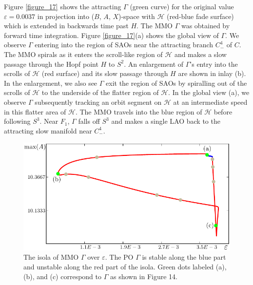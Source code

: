 \documentclass{ws-ijbc}
\begin{document}
Figure \ref{figure_17} shows the attracting $\Gamma$ (green curve) for the original value $\varepsilon=0.0037$ in projection into ($B$, $A$, $X$)-space with $\mathscr{H}$ (red-blue fade surface) which is extended in backwards time past $H$.  The MMO $\Gamma$ was obtained by forward time integration.  Figure \ref{figure_17}(a) shows the global view of $\Gamma$.  We observe $\Gamma$ entering into the region of SAOs near the attracting branch $C^4_-$ of $C$.  The MMO spirals as it enters the scroll-like region of $\mathscr{H}$ and makes a slow passage through the Hopf point $H$ to $S^2$.  An enlargement of $\Gamma$'s entry into the scrolls of $\mathscr{H}$ (red surface) and its slow passage through $H$ are shown in inlay (b).  In the enlargement, we also see $\Gamma$ exit the region of SAOs by spiralling out of the scrolls of $\mathscr{H}$ to the underside of the flatter region of $\mathscr{H}$.  In the global view (a), we observe $\Gamma$ subsequently tracking an orbit segment on $\mathscr{H}$ at an intermediate speed in this flatter area of $\mathscr{H}$.  The MMO travels into the blue region of $\mathscr{H}$ before following $S^3$.  Near $F_1$, $\Gamma$ falls off $S^3$ and makes a single LAO back to the attracting slow manifold near $C^4_-$.

\begin{figure}[H]
\centering
\includegraphics[]{./figures/MKMO_18.pdf}
\caption{The isola of MMO $\Gamma$ over $\varepsilon$.  The PO $\Gamma$ is stable along the blue part and unstable along the red part of the isola.  Green dots labeled (a), (b), and (c) correspond to $\Gamma$ as shown in Figure 14.}
\label{figure_18}
\end{figure}
\end{document}
